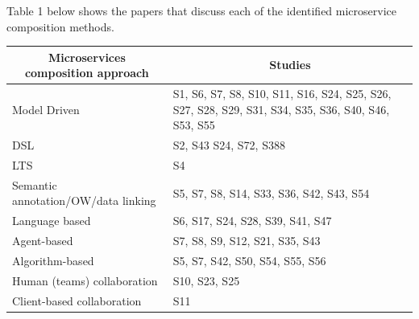 \documentclass{article}
\begin{document}
\begin{multicols}{2}
Table 1 below shows the papers that discuss each of the identified microservice composition methods.

\begin{table}[ht!]
\begin{center}
\scriptsize
\begin{tabular}{ | m{20em} | m{20em} | }
\hline
\multicolumn{1}{|c|}{\textbf{Microservices composition approach}} & \multicolumn{1}{c|}{\textbf{Studies}}                                                                   \\ \hline
Model Driven                                                      & S1,   S6, S7, S8, S10, S11, S16, S24, S25, S26, S27, S28, S29, S31, S34, S35, S36,   S40, S46, S53, S55 \\ \hline
DSL                                                               & S2,   S43 S24, S72, S388                                                                                \\ \hline
LTS                                                               & S4                                                                                                      \\ \hline
Semantic   annotation/OW/data linking                             & S5,   S7, S8, S14, S33, S36, S42, S43, S54                                                              \\ \hline
Language   based                                                  & S6,   S17, S24, S28, S39, S41, S47                                                                      \\ \hline
Agent-based                                                       & S7,   S8, S9, S12, S21, S35, S43                                                                        \\ \hline
Algorithm-based                                                   & S5,   S7, S42, S50, S54, S55, S56                                                                       \\ \hline
Human   (teams) collaboration                                     & S10,   S23, S25                                                                                         \\ \hline
Client-based   collaboration                                      & S11                                                                                                     \\ \hline

\end{tabular}
\end{center}
\end{table}
\end{multicols}
\end{document}
